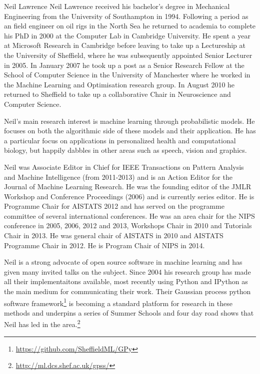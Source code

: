 \begin{participant}[PM=6,salary=10000]{Neil Lawrence}
  Neil Lawrence received his bachelor's degree in Mechanical
  Engineering from the University of Southampton in 1994. Following a
  period as an field engineer on oil rigs in the North Sea he returned
  to academia to complete his PhD in 2000 at the Computer Lab in
  Cambridge University. He spent a year at Microsoft Research in
  Cambridge before leaving to take up a Lectureship at the University
  of Sheffield, where he was subsequently appointed Senior Lecturer in
  2005. In January 2007 he took up a post as a Senior Research Fellow
  at the School of Computer Science in the University of Manchester
  where he worked in the Machine Learning and Optimisation research
  group. In August 2010 he returned to Sheffield to take up a
  collaborative Chair in Neuroscience and Computer Science.

  Neil's main research interest is machine learning through
  probabilistic models. He focuses on both the algorithmic side of
  these models and their application. He has a particular focus on
  applications in personalized health and computational biology, but
  happily dabbles in other areas such as speech, vision and graphics.

  Neil was Associate Editor in Chief for IEEE Transactions on Pattern
  Analysis and Machine Intelligence (from 2011-2013) and is an Action
  Editor for the Journal of Machine Learning Research. He was the
  founding editor of the JMLR Workshop and Conference Proceedings
  (2006) and is currently series editor. He is Programme Chair for
  AISTATS 2012 and has served on the programme committee of several
  international conferences. He was an area chair for the NIPS
  conference in 2005, 2006, 2012 and 2013, Workshops Chair in 2010 and
  Tutorials Chair in 2013. He was general chair of AISTATS in 2010 and
  AISTATS Programme Chair in 2012. He is Program Chair of NIPS in
  2014.

  Neil is a strong advocate of open source software in machine
  learning and has given many invited talks on the subject. Since 2004
  his research group has made all their implementaitons available,
  most recently using Python and IPython as the main medium for
  communicating their work. Their Gaussian process python software
  framework\footnote{\url{https://github.com/SheffieldML/GPy}} is
  becoming a standard platform for research in these methods and
  underpins a series of Summer Schools and four day road shows that
  Neil has led in the
  area.\footnote{\url{http://ml.dcs.shef.ac.uk/gpss/}}
\end{participant}

